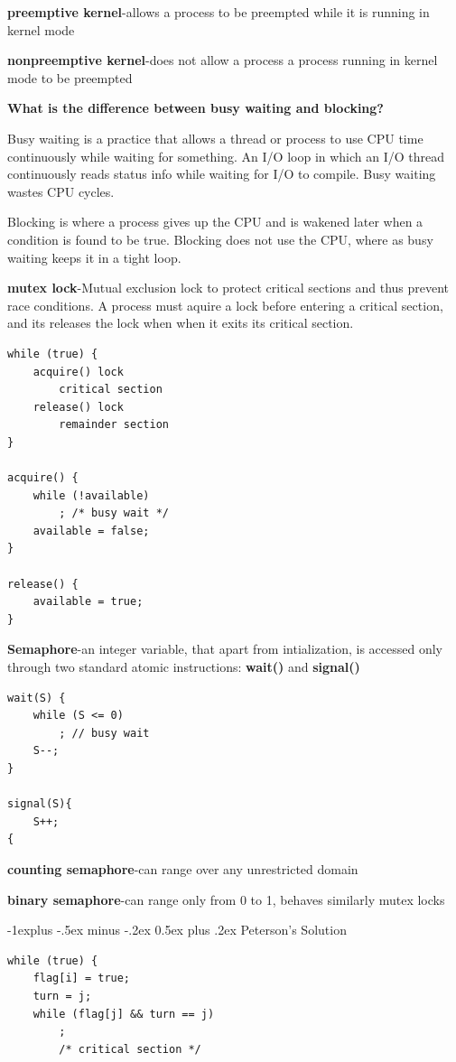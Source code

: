 \documentclass[8pt,landscape]{article}
\makeatletter
\renewcommand{\subsection}{\@startsection{subsection}{2}{0mm}%
                                {-1explus -.5ex minus -.2ex}%
                                {0.5ex plus .2ex}%
                                {\normalfont\scriptsize\bfseries}}
\makeatother
\begin{document}
\begin{multicols}{3}
\begin{tiny}
\textbf{preemptive kernel}-allows a process to be preempted while it is running in kernel mode

\textbf{nonpreemptive kernel}-does not allow a process a process running in kernel mode to be
preempted

\textbf{What is the difference between busy waiting and blocking?}

Busy waiting is a practice that allows a thread or process to use CPU time continuously while 
waiting for something. An I/O loop in which an I/O thread continuously reads status info while 
waiting for I/O to compile. Busy waiting wastes CPU cycles.

Blocking is where a process gives up the CPU and is wakened later when a condition is found to be 
true. Blocking does not use the CPU, where as busy waiting keeps it in a tight loop.

\textbf{mutex lock}-Mutual exclusion lock to protect critical sections and thus prevent race 
conditions. A process must aquire a lock before entering a critical section, and its releases the
lock when when it exits its critical section.

\begin{verbatim}
while (true) {
	acquire() lock
        critical section
	release() lock
        remainder section
}

acquire() {
    while (!available)
        ; /* busy wait */
    available = false;
}

release() {
    available = true;
}
\end{verbatim}


\textbf{Semaphore}-an integer variable, that apart from intialization, is accessed only through
two standard atomic instructions: \textbf{wait()} and \textbf{signal()}

\begin{verbatim}
wait(S) {
    while (S <= 0)
        ; // busy wait
    S--;
}

signal(S){
    S++;
{
\end{verbatim}

\textbf{counting semaphore}-can range over any unrestricted domain

\textbf{binary semaphore}-can range only from 0 to 1, behaves similarly mutex locks

\subsection{Peterson's Solution}

\begin{verbatim}
while (true) {
    flag[i] = true;
    turn = j;
    while (flag[j] && turn == j)
        ;
        /* critical section */


\end{verbatim}
\end{tiny}
\end{multicols}
\end{document}
